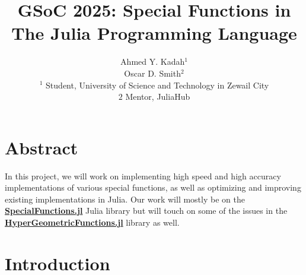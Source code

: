 \documentclass{article}
\title{GSoC 2025: Special Functions in The Julia Programming Language}
\author{Ahmed Y. Kadah$^1$  
\\Oscar D. Smith$^2$ 
\\$^1$ Student, University of Science and Technology in Zewail City
\\ $2$ Mentor, JuliaHub}
\date{}
\theoremstyle{mytheoremstyle}
\theoremstyle{mytheoremstyle}
\theoremstyle{myproblemstyle}
\begin{document}
    \maketitle


  \section*{Abstract}
    In this project, we will work on implementing high speed and high accuracy implementations of various special functions, as well as optimizing and improving existing implementations in Julia.
    Our work will mostly be on the \href{https://github.com/JuliaMath/SpecialFunctions.jl}{\textbf{SpecialFunctions.jl}} Julia library but will touch on some of the issues in the \href{https://github.com/JuliaMath/HypergeometricFunctions.jl/issues}{\textbf{HyperGeometricFunctions.jl}} library as well. 

  \section*{Introduction}
\end{document}

